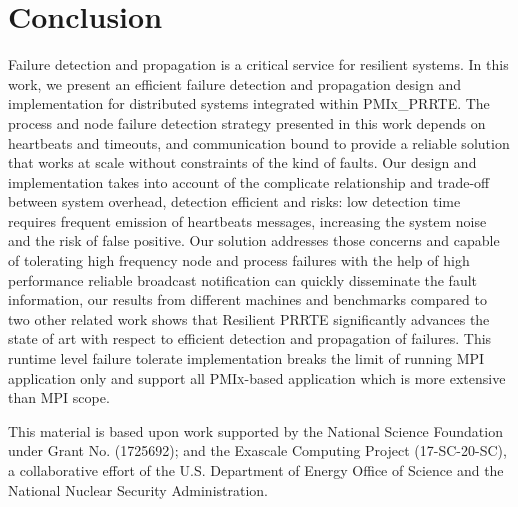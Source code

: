 \documentclass[sigconf]{acmart}
\newcommand{\prrte}[0]{\textsc{PRRTE}\xspace}
\newcommand{\pmix}[0]{\textsc{PMIx}\xspace}
\newcommand{\mpi}[0]{\textsc{MPI}\xspace}
\begin{document}
\section{Conclusion}\label{sec:conclusion}
Failure detection and propagation is a critical service for resilient systems. In this work, we present an efficient failure detection and propagation design and implementation for distributed systems integrated within \pmix\_\prrte. The process and node failure detection strategy presented in this work depends on heartbeats and timeouts, and communication bound to provide a reliable solution that works at scale without constraints of the kind of faults. Our design and implementation takes into account of the complicate relationship and trade-off between system overhead, detection efficient and risks: low detection time requires frequent emission of heartbeats messages, increasing the system noise and the risk of false positive. Our solution addresses those concerns and capable of tolerating high frequency node and process failures with the help of high performance reliable broadcast notification can quickly disseminate the fault information, our results from different machines and benchmarks compared to two other related work shows that Resilient \prrte significantly advances the state of art with respect to efficient detection and propagation of failures. This runtime level failure tolerate implementation breaks the limit of running \mpi  application only and support all \pmix-based application which is more extensive than \mpi scope.   


%
\begin{acks}
This material is based upon work supported by the National Science Foundation under Grant No. (1725692); and the Exascale Computing Project (17-SC-20-SC), a collaborative effort of the 
U.S. Department of Energy Office of Science and the National Nuclear Security Administration.    
\end{acks}

%


\end{document}
